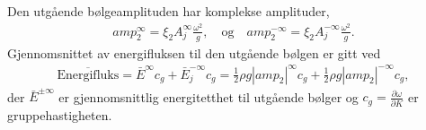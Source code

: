 Den utgående bølgeamplituden har komplekse amplituder,
\begin{align}
	amp_2^{\infty} = \xi_2 A_j^{ \infty} \frac{\omega^2}{g}, \quad \text{og} \quad amp_2^{-\infty} = \xi_2 A_j^{- \infty} \frac{\omega^2}{g}.
\end{align}
Gjennomsnittet av energifluksen til den utgående bølgen er gitt ved
\begin{align}
	\overline{\text{Energifluks}} = \bar{E}^{\infty}c_g + \bar{E}_j^{-\infty}c_g =  \frac{1}{2}\rho g {|amp_2|}^{\infty}c_g + \frac{1}{2}\rho g {|amp_2|}^{-\infty}c_g,
\end{align}
der $\bar{E}^{\pm \infty}$ er gjennomsnittlig energitetthet til utgående bølger og $c_g = \frac{\partial \omega}{\partial K}$ er gruppehastigheten. 
